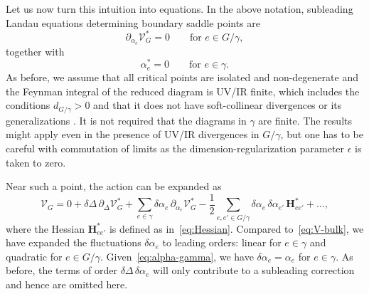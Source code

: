 \documentclass[12pt]{article}
\numberwithin{figure}{section}
\def \be {\begin{equation}}
\def \ee {\end{equation}}
\def \V {\mathcal{V}}
\begin{document}
        	    Let us now turn this intuition into equations. In the above notation, subleading Landau equations determining boundary saddle points are
                \be
                \partial_{\alpha_e} \V^\ast_G  = 0 \qquad \text{for }e\in G/\gamma,
                \ee
                together with
                \be\label{eq:alpha-gamma}
                \alpha_e^\ast = 0 \qquad \text{for } e\in\gamma.
                \ee
                As before, we assume that all critical points are isolated and non-degenerate and the Feynman integral of the reduced diagram is UV/IR finite, which includes the conditions $d_{G/\gamma} > 0$ and that it does not have soft-collinear divergences or its generalizations \cite{Arkani-Hamed:2022cqe}. It is not required that the diagrams in $\gamma$ are finite. The results might apply even in the presence of UV/IR divergences in $G/\gamma$, but one has to be careful with commutation of limits as the dimension-regularization parameter $\epsilon$ is taken to zero.
                
                Near such a point, the action can be expanded as
                \be
                \V_G = 0 + \delta\Delta\, \partial_\Delta \V^\ast_G + \sum_{e \in \gamma} \delta \alpha_e\, \partial_{\alpha_e} \V^\ast_G - \frac{1}{2} \sum_{e,e' \in G/\gamma} \delta\alpha_e\, \delta\alpha_{e'}\, \mathbf{H}_{e e'}^\ast + \ldots,
                \ee
				where the Hessian $\mathbf{H}_{ee'}^\ast$ is defined as in~\eqref{eq:Hessian}. Compared to~\eqref{eq:V-bulk}, we have expanded the fluctuations $\delta\alpha_{e}$ to leading orders: linear for $e\in \gamma$ and quadratic for $e \in G/\gamma$. Given~\eqref{eq:alpha-gamma}, we have $\delta \alpha_e = \alpha_e$ for $e\in \gamma$. As before, the terms of order $\delta \Delta\, \delta \alpha_e$ will only contribute to a  subleading correction and hence are omitted here. 
				
\end{document}
